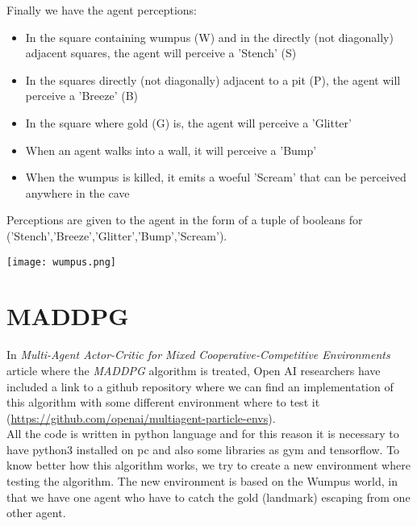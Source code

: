 \documentclass[]{report}
\begin{document}
\vspace{7 mm}
Finally we have the agent perceptions:
\vspace{5 mm}

\begin{itemize}
  \item In the square containing wumpus (W) and in the directly (not diagonally) adjacent squares, the agent will perceive a 'Stench' (S)
  \item In the squares directly (not diagonally) adjacent to a pit (P), the agent will perceive a 'Breeze' (B)
  \item In the square where  gold (G) is, the agent will perceive a 'Glitter'
  \item When an agent walks into a wall, it will perceive a 'Bump'
  \item When the wumpus is killed, it emits a woeful 'Scream' that can be perceived anywhere in the cave
\end{itemize}

Perceptions are given to the agent in the form of a tuple of booleans for
('Stench','Breeze','Glitter','Bump','Scream').

\vspace{10 mm}

\begin{center}
	\texttt{[image: wumpus.png]}
\end{center}
 
\vspace{30 mm}
\section{MADDPG}
In \emph{Multi-Agent Actor-Critic for Mixed Cooperative-Competitive Environments} article where the \emph{MADDPG} algorithm is treated, Open AI researchers have included a link to a github repository where we can find an implementation of this algorithm with some different environment where to test it (\url{https://github.com/openai/multiagent-particle-envs}).\\ 
All the code is written in python language and for this reason it is necessary to have python3 installed on pc and also some libraries as gym and tensorflow.
To know better how this algorithm works, we try to create a new environment where testing the algorithm.
The new environment is based on the Wumpus world, in that we have one agent who have to catch the gold (landmark) escaping from one other agent.
\end{document}
